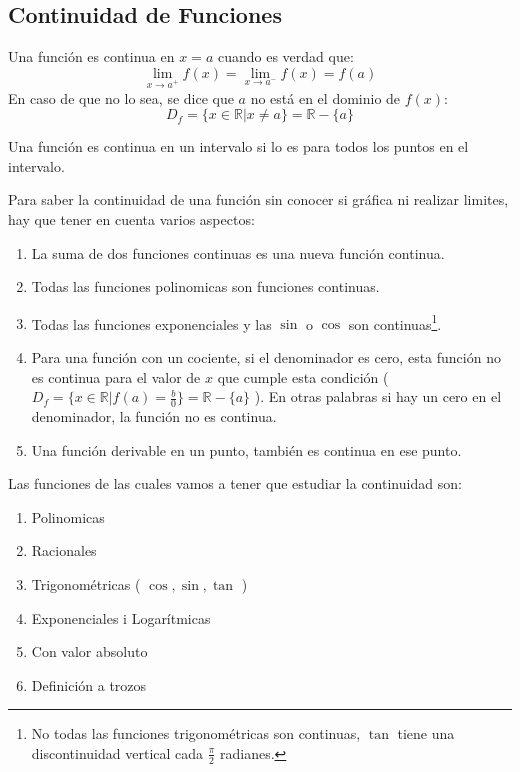 \documentclass[arial,a4paper,print]{article}
\begin{document}
\subsection{Continuidad de Funciones}

Una función es continua en $x = a$ cuando es verdad que:
\begin{equation*}
	\lim_{x\rightarrow a^{+}} f(x) = \lim_{x\rightarrow a^{-}} f(x) = f(a)
\end{equation*}
En caso de que no lo sea, se dice que $a$ no está en el dominio de $f(x)$:
\begin{equation*}
	D_{f} = \{x \in \mathbb{R} | x \neq a\} = \mathbb{R} - \{a\}
\end{equation*}

Una función es continua en un intervalo si lo es para todos los puntos en el intervalo. 

Para saber la continuidad de una función sin conocer si gráfica ni realizar limites, hay que tener en cuenta varios aspectos:
\begin{enumerate}
\item La suma de dos funciones continuas es una nueva función continua.
\item Todas las funciones polinomicas son funciones continuas. 
\item Todas las funciones exponenciales y las $\sin$ o $\cos$ son continuas\footnote{No todas las funciones trigonométricas son continuas, $\tan$ tiene una discontinuidad vertical cada $\frac{\pi}{2}$ radianes.}. 
\item Para una función con un cociente, si el denominador es cero, esta función no es continua para el valor de $x$ que cumple esta condición ( $D_{f} = \{x \in \mathbb{R} | f(a) = \frac{b}{0}\} = \mathbb{R} - \{a\} $ ). En otras palabras si hay un cero en el denominador, la función no es continua. 
\item Una función derivable en un punto, también es continua en ese punto. 
\end{enumerate}

Las funciones de las cuales vamos a tener que estudiar la continuidad son:
\begin{enumerate}
\item Polinomicas
\item Racionales
\item Trigonométricas ( $\cos, \sin, \tan$ )
\item Exponenciales i Logarítmicas
\item Con valor absoluto
\item Definición a trozos
\end{enumerate}
\end{document}
